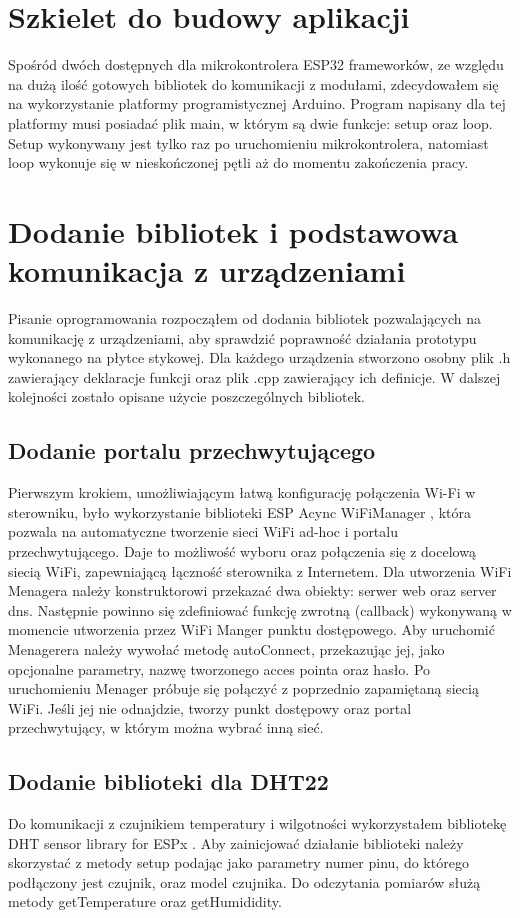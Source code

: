 \documentclass[11pt]{report}
\begin{document}
 \section{Szkielet do budowy aplikacji}
 Spośród dwóch dostępnych dla mikrokontrolera ESP32 frameworków, ze względu na dużą ilość gotowych bibliotek do komunikacji z modułami, zdecydowałem się na wykorzystanie platformy programistycznej Arduino.
 Program napisany dla tej platformy musi posiadać plik main, w którym są dwie funkcje: setup oraz loop.
 Setup wykonywany jest tylko raz po uruchomieniu mikrokontrolera, natomiast loop wykonuje się w nieskończonej pętli aż do momentu zakończenia pracy.
 
 \section{Dodanie bibliotek i podstawowa komunikacja z urządzeniami}
 Pisanie oprogramowania rozpocząłem od dodania bibliotek pozwalających na komunikację z urządzeniami, aby sprawdzić poprawność działania prototypu wykonanego na płytce stykowej. Dla każdego urządzenia stworzono osobny plik .h zawierający deklaracje funkcji oraz plik .cpp zawierający ich definicje.
 W dalszej kolejności zostało opisane użycie poszczególnych bibliotek.
  \subsection{Dodanie portalu przechwytującego}
 Pierwszym krokiem, umożliwiającym łatwą konfigurację połączenia Wi-Fi w sterowniku, było wykorzystanie biblioteki ESP Acync WiFiManager \cite{WiFiManager}, która pozwala na automatyczne tworzenie sieci WiFi ad-hoc i portalu przechwytującego. Daje to możliwość wyboru oraz połączenia się z docelową siecią WiFi, zapewniającą łączność sterownika z Internetem.
 Dla utworzenia WiFi Menagera należy konstruktorowi przekazać dwa obiekty: serwer web oraz server dns. Następnie powinno się zdefiniować funkcję zwrotną (callback) wykonywaną w momencie utworzenia przez WiFi Manger punktu dostępowego. Aby uruchomić Menagerera należy wywołać metodę autoConnect, przekazując jej, jako opcjonalne parametry, nazwę tworzonego acces pointa oraz hasło. Po uruchomieniu Menager próbuje się połączyć z poprzednio zapamiętaną siecią WiFi. Jeśli jej nie odnajdzie, tworzy punkt dostępowy oraz portal przechwytujący, w którym można wybrać inną sieć.
 \subsection{Dodanie biblioteki dla DHT22}
 Do komunikacji z czujnikiem temperatury i wilgotności wykorzystałem bibliotekę DHT sensor library for ESPx \cite{DHTlibrary}. Aby zainicjować działanie biblioteki należy skorzystać z metody setup podając jako parametry numer pinu, do którego podłączony jest czujnik, oraz model czujnika. Do odczytania pomiarów służą metody getTemperature oraz getHumididity.
\end{document}
